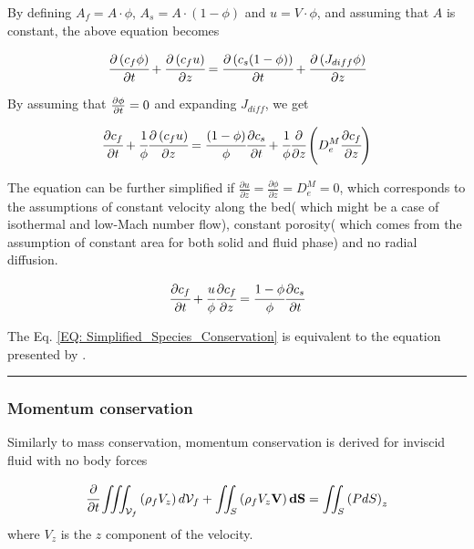 \documentclass[../Article_Model_Parameters.tex]{subfiles}
\begin{document}
	By defining $A_f = A \cdot \phi$, $A_s = A \cdot \left( 1-\phi \right)$ and $u=V \cdot \phi$, and assuming that $A$ is constant, the above equation becomes
	
	{\footnotesize
		\begin{equation}
			\cfrac{\partial \left( c_f \phi \right)}{\partial t} + \cfrac{\partial \left( c_f u\right)}{\partial z} = \cfrac{\partial \left( c_s (1-\phi) \right) }{\partial t} + \cfrac{\partial \left( J_{diff} \phi \right) }{\partial z}
		\end{equation}
	}

	By assuming that ${\footnotesize \frac{\partial \phi}{\partial t}=0}$ and expanding $J_{diff}$, we get
	
	{\footnotesize
		\begin{equation}
			\cfrac{\partial c_f}{\partial t} + \cfrac{1}{\phi} \cfrac{\partial \left( c_f u\right)}{\partial z} = \cfrac{ (1-\phi)}{\phi} \cfrac{\partial c_s }{\partial t} + \cfrac{1}{\phi} \cfrac{\partial}{\partial z} \left( D_e^M \cfrac{\partial c_f}{\partial z} \right)
		\end{equation}
	}
	
	The equation can be further simplified if $\frac{\partial u}{\partial z} = \frac{\partial \phi}{\partial z} = D_e^M = 0$, which corresponds to the assumptions of constant velocity along the bed( which might be a case of isothermal and low-Mach number flow), constant porosity( which comes from the assumption of constant area for both solid and fluid phase) and no radial diffusion.
	
	{\footnotesize
		\begin{equation}
			\cfrac{\partial c_f}{\partial t} + \cfrac{u}{\phi} \cfrac{\partial c_f}{\partial z}  = \cfrac{1-\phi}{\phi} \cfrac{\partial c_s}{\partial t} 
			\label{EQ: Simplified_Species_Conservation}
		\end{equation}
	}

	The Eq. \ref{EQ: Simplified_Species_Conservation} is equivalent to the equation presented by \citet{Reverchon1996}.
	
	\hrule
	
	\subsubsection{Momentum conservation}
	
	Similarly to mass conservation, momentum conservation is derived for inviscid fluid with no body forces
	
	{\footnotesize
		\begin{equation}
			\cfrac{\partial}{\partial t} \iiint_{\mathcal{V}_f} \left( \rho_f V_z \right) d\mathcal{V}_f + \iint_S \left( \rho_f V_z \textbf{V} \right) \textbf{dS} = \iint_S \left( P dS \right)_z
			\label{EQ: Momentum_Integral_Form}
		\end{equation}
	}
	where $V_z$ is the $z$ component of the velocity.
\end{document}
